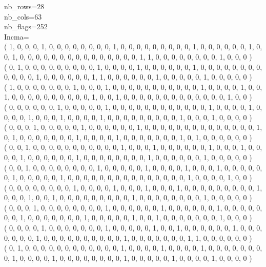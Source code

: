 \documentclass{article}
\begin{document}
{nb\_rows=28\\
nb\_cols=63\\
nb\_flags=252\\
Incma=\\
( 1, 0, 0, 0, 1, 0, 0, 0, 0, 0, 0, 0, 0, 1, 0, 0, 0, 0, 0, 0, 0, 0, 0, 1, 0, 0, 0, 0, 0, 0, 1, 0, 0, 1, 0, 0, 0, 0, 0, 0, 0, 0, 0, 0, 0, 0, 0, 0, 0, 1, 1, 0, 0, 0, 0, 0, 0, 0, 0, 1, 0, 0, 0 )\\
( 0, 1, 0, 0, 0, 0, 0, 0, 0, 0, 0, 1, 0, 0, 0, 0, 1, 0, 0, 0, 0, 0, 0, 1, 0, 0, 0, 0, 0, 0, 0, 0, 0, 0, 0, 0, 1, 0, 0, 0, 0, 0, 0, 1, 1, 0, 0, 0, 0, 0, 0, 1, 0, 0, 0, 0, 0, 1, 0, 0, 0, 0, 0 )\\
( 1, 0, 0, 0, 0, 0, 0, 0, 1, 0, 0, 0, 1, 0, 0, 0, 0, 0, 0, 0, 0, 0, 0, 0, 1, 0, 0, 0, 0, 1, 0, 0, 1, 0, 0, 0, 0, 0, 0, 0, 0, 0, 0, 1, 0, 0, 1, 0, 0, 0, 0, 0, 0, 0, 0, 0, 0, 0, 0, 0, 1, 0, 0 )\\
( 0, 0, 0, 0, 0, 0, 1, 0, 0, 0, 0, 0, 1, 0, 0, 0, 0, 0, 0, 0, 0, 0, 0, 0, 0, 1, 0, 0, 0, 0, 1, 0, 0, 0, 0, 1, 0, 0, 0, 1, 0, 0, 0, 0, 1, 0, 0, 0, 0, 0, 0, 0, 0, 0, 1, 0, 0, 0, 1, 0, 0, 0, 0 )\\
( 0, 0, 0, 1, 0, 0, 0, 0, 0, 1, 0, 0, 0, 0, 0, 0, 1, 0, 0, 0, 0, 0, 0, 0, 0, 0, 0, 0, 0, 0, 0, 1, 0, 1, 0, 0, 0, 0, 0, 0, 0, 1, 0, 0, 0, 0, 1, 0, 0, 0, 0, 0, 0, 0, 1, 0, 1, 0, 0, 0, 0, 0, 0 )\\
( 0, 0, 1, 0, 0, 0, 0, 0, 0, 0, 0, 0, 0, 0, 1, 0, 0, 0, 1, 0, 0, 0, 0, 0, 0, 1, 0, 0, 0, 1, 0, 0, 0, 0, 1, 0, 0, 0, 0, 0, 0, 1, 0, 0, 0, 0, 0, 0, 0, 0, 1, 0, 0, 0, 0, 0, 0, 1, 0, 0, 0, 0, 0 )\\
( 0, 0, 1, 0, 0, 0, 0, 0, 0, 0, 0, 1, 0, 0, 0, 0, 0, 1, 0, 0, 0, 0, 1, 0, 0, 0, 1, 0, 0, 0, 0, 0, 0, 1, 0, 0, 0, 0, 0, 1, 0, 0, 0, 0, 0, 0, 0, 0, 0, 0, 0, 0, 0, 0, 0, 1, 0, 0, 0, 0, 1, 0, 0 )\\
( 0, 0, 0, 0, 0, 0, 0, 0, 1, 0, 0, 0, 0, 1, 0, 0, 0, 1, 0, 0, 0, 1, 0, 0, 0, 0, 0, 0, 0, 0, 0, 1, 0, 0, 0, 1, 0, 0, 1, 0, 0, 0, 0, 0, 0, 0, 0, 0, 1, 0, 0, 0, 0, 0, 0, 0, 0, 1, 0, 0, 0, 0, 0 )\\
( 0, 0, 0, 1, 0, 0, 0, 0, 0, 0, 0, 0, 1, 0, 0, 0, 0, 0, 0, 1, 0, 0, 0, 0, 0, 0, 1, 0, 0, 0, 0, 0, 0, 0, 1, 0, 0, 0, 0, 0, 0, 0, 1, 0, 0, 0, 0, 0, 1, 0, 0, 1, 0, 0, 0, 0, 0, 0, 0, 1, 0, 0, 0 )\\
( 0, 0, 0, 0, 1, 0, 0, 0, 0, 0, 0, 0, 1, 0, 0, 0, 0, 0, 1, 0, 0, 1, 0, 0, 0, 0, 0, 0, 1, 0, 0, 0, 0, 0, 0, 0, 1, 0, 0, 0, 0, 0, 0, 0, 0, 0, 0, 1, 0, 0, 0, 0, 0, 0, 0, 1, 1, 0, 0, 0, 0, 0, 0 )\\
( 0, 1, 0, 0, 0, 0, 0, 0, 0, 0, 0, 0, 0, 0, 1, 0, 0, 0, 0, 1, 0, 0, 0, 0, 1, 0, 0, 0, 0, 0, 0, 0, 0, 1, 0, 0, 0, 0, 1, 0, 0, 0, 0, 0, 0, 0, 0, 1, 0, 0, 0, 0, 0, 1, 0, 0, 0, 0, 1, 0, 0, 0, 0 )\\
}
\end{document}
